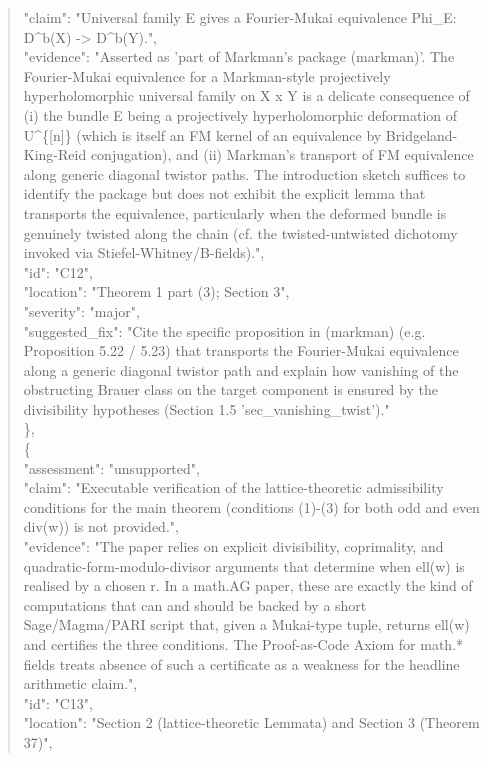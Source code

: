 \documentclass[11pt]{article}
\begin{document}
\begin{quote}
      "claim": "Universal family E gives a Fourier-Mukai equivalence Phi\_E: D\^{}b(X) -> D\^{}b(Y).",\\
      "evidence": "Asserted as 'part of Markman's package (markman)'. The Fourier-Mukai equivalence for a Markman-style projectively hyperholomorphic universal family on X x Y is a delicate consequence of (i) the bundle E being a projectively hyperholomorphic deformation of U\^{}\{[n]\} (which is itself an FM kernel of an equivalence by Bridgeland-King-Reid conjugation), and (ii) Markman's transport of FM equivalence along generic diagonal twistor paths. The introduction sketch suffices to identify the package but does not exhibit the explicit lemma that transports the equivalence, particularly when the deformed bundle is genuinely twisted along the chain (cf. the twisted-untwisted dichotomy invoked via Stiefel-Whitney/B-fields).",\\
      "id": "C12",\\
      "location": "Theorem 1 part (3); Section 3",\\
      "severity": "major",\\
      "suggested\_fix": "Cite the specific proposition in (markman) (e.g. Proposition 5.22 / 5.23) that transports the Fourier-Mukai equivalence along a generic diagonal twistor path and explain how vanishing of the obstructing Brauer class on the target component is ensured by the divisibility hypotheses (Section 1.5 'sec\_vanishing\_twist')."\\
    \},\\
    \{\\
      "assessment": "unsupported",\\
      "claim": "Executable verification of the lattice-theoretic admissibility conditions for the main theorem (conditions (1)-(3) for both odd and even div(w)) is not provided.",\\
      "evidence": "The paper relies on explicit divisibility, coprimality, and quadratic-form-modulo-divisor arguments that determine when ell(w) is realised by a chosen r. In a math.AG paper, these are exactly the kind of computations that can and should be backed by a short Sage/Magma/PARI script that, given a Mukai-type tuple, returns ell(w) and certifies the three conditions. The Proof-as-Code Axiom for math.* fields treats absence of such a certificate as a weakness for the headline arithmetic claim.",\\
      "id": "C13",\\
      "location": "Section 2 (lattice-theoretic Lemmata) and Section 3 (Theorem 37)",\\

\end{quote}
\end{document}
